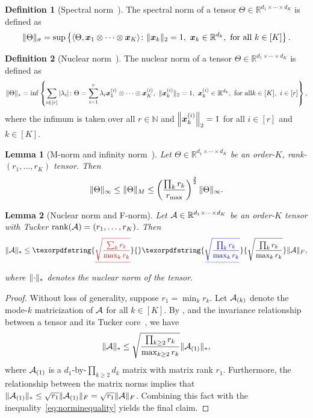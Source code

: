 \documentclass[11pt]{article}
\theoremstyle{plain}
\newtheorem{lem}{Lemma}
\theoremstyle{definition}
\newtheorem{defn}{Definition}
\providecommand{\DIFaddtex}[1]{{\protect\color{blue}\uwave{#1}}} %
\providecommand{\DIFdeltex}[1]{{\protect\color{red}\sout{#1}}}                      %
\providecommand{\DIFaddbegin}{} %
\providecommand{\DIFaddend}{} %
\providecommand{\DIFdelbegin}{} %
\providecommand{\DIFdelend}{} %
\providecommand{\DIFadd}[1]{\texorpdfstring{\DIFaddtex{#1}}{#1}} %
\providecommand{\DIFdel}[1]{\texorpdfstring{\DIFdeltex{#1}}{}} %
\begin{document}
\begin{defn}[Spectral norm~\citep{lim2005singular}]
The spectral norm of a tensor $\Theta\in\mathbb{R}^{d_1\times \cdots \times d_K}$ is defined as
\[
\snormSize{}{\Theta}=\sup\left\{\langle \Theta, \mx_1\otimes \cdots \otimes \mx_K\rangle \colon \vnormSize{}{\mx_k}=1,\ \mx_k\in\mathbb{R}^{d_k},\ \text{for all}\ k\in[K]\right\}.
\]
\end{defn}

\begin{defn}[Nuclear norm~\citep{friedland2018nuclear}]
The nuclear norm of a tensor $\Theta\in\mathbb{R}^{d_1\times \cdots \times d_K}$ is defined as
\[
\nnormSize{}{\Theta}=\inf
\left\{
\sum_{i\in[r]}|\lambda_i|\colon \Theta=\sum_{i=1}^r \lambda_i\mx^{(i)}_1\otimes \cdots \otimes \mx^{(i)}_K,\ \vnormSize{}{\mx^{(i)}_k}=1,\ \mx^{(i)}_k\in\mathbb{R}^{d_k},\ \text{for all} k\in[K],\ i\in[r]
\right\},
\]
where the infimum is taken over all $r\in\mathbb{N}$ and $\left\lVert\bm x^{(i)}_k\right\rVert_2=1$ for all $i\in[r]$ and $k\in[K]$.
\end{defn}



\begin{lem}[M-norm and infinity norm~\citep{ghadermarzy2019near}]\label{lem:Mnormbound}
Let $\Theta\in\mathbb{R}^{d_1\times \cdots \times d_K}$ be an order-$K$, rank-$(r_1,\ldots,r_K)$ tensor. Then
\[
\lVert\Theta\rVert_\infty\leq \lVert\Theta\rVert_M\leq \left(\prod_k r_k \over r_{\max}\right)^{3\over 2} \lVert\Theta\rVert_\infty.
\]
\end{lem}


\begin{lem}[Nuclear norm and F-norm] \label{lem:nuclear}
Let $\mathcal{A}\in\mathbb{R}^{d_1\times\cdots\times d_K}$ be an order-$K$ tensor with Tucker $\text{rank}(\mathcal{A})=(r_1,\ldots,r_K)$. Then
\[
\nnormSize{}{\tA} \leq \DIFdelbegin \DIFdel{\sqrt{\sum_k r_k\over \max_k r_k} }\DIFdelend \DIFaddbegin \DIFadd{\sqrt{\prod_k r_k\over \max_k r_k} }\DIFaddend \FnormSize{}{\tA},
\]
where $\lVert\cdot\rVert_*$ denotes the nuclear norm of the tensor.
\end{lem}

\begin{proof}
Without loss of generality, suppose $r_1=\min_k r_k$. Let $\mathcal{A}_{(k)}$ denote the mode-$k$ matricization of $\mathcal{A}$ for all $k\in[K]$. By \citet[Corollary 4.11]{wang2017operator}, and the invariance relationship between a tensor and its Tucker core~\citep[Section 6]{jiang2017tensor}, we have
\begin{equation}\label{eq:norminequality}
\lVert\mathcal{A}\rVert_* \leq \sqrt{\prod_{k\geq 2} r_k \over \max_{k\geq 2} r_k} \lVert\mathcal{A}_{(1)}\rVert_*,
\end{equation}
where $\mathcal{A}_{(1)}$ is a $d_1$-by-$\prod_{k\geq 2}d_k$ matrix with matrix rank $r_1$. Furthermore, the relationship between the matrix norms implies that $\lVert\mathcal{A}_{(1)}\rVert_*\leq \sqrt{r_1}\lVert\mathcal{A}_{(1)}\rVert_F=\sqrt{r_1}\lVert\mathcal{A}\rVert_F$. Combining this fact with the inequality~\eqref{eq:norminequality} yields the final claim.
\end{proof}
\end{document}
